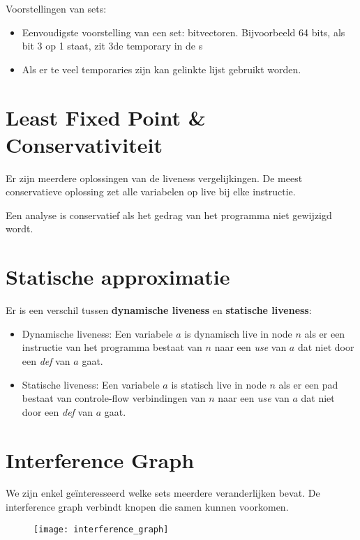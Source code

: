 Voorstellingen van sets:
\begin{itemize}
	\item Eenvoudigste voorstelling van een set: bitvectoren. Bijvoorbeeld 64 bits, als bit 3 op 1 staat, zit 3de temporary in de s
	\item Als er te veel temporaries zijn kan gelinkte lijst gebruikt worden.
\end{itemize}


\section{Least Fixed Point \& Conservativiteit}
Er zijn meerdere oplossingen van de liveness vergelijkingen. De meest conservatieve oplossing zet alle variabelen op live bij elke instructie. 


Een analyse is conservatief als het gedrag van het programma niet gewijzigd wordt.


\section{Statische approximatie}
Er is een verschil tussen \textbf{dynamische liveness} en \textbf{statische liveness}:
\begin{itemize}
	\item Dynamische liveness: Een variabele $a$ is dynamisch live in node $n$ als er een instructie van het programma bestaat van $n$ naar een \textit{use} van $a$ dat niet door een \textit{def} van $a$ gaat.
	\item Statische liveness: Een variabele $a$ is statisch live in node $n$ als er een pad bestaat van controle-flow verbindingen van $n$ naar een \textit{use} van $a$ dat niet door een \textit{def} van $a$ gaat.
\end{itemize}


\section{Interference Graph}
We zijn enkel geïnteresseerd welke sets meerdere veranderlijken bevat. De interference graph verbindt knopen die samen kunnen voorkomen.
\begin{figure}[ht]
	\centering
	\texttt{[image: interference\_graph]}
\end{figure}